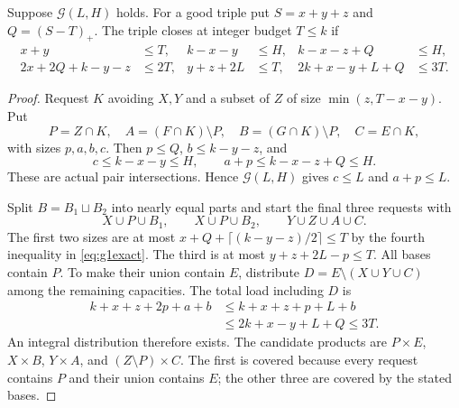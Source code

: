 \begin{lemma}\label{lem:gapsurvive}
Suppose $\mathcal G(L,H)$ holds. For a good triple put $S=x+y+z$ and
$Q=(S-T)_+$. The triple closes at integer budget $T\le k$ if
\begin{align}
 x+y&\le T,& k-x-y&\le H,& k-x-z+Q&\le H,\label{eq:g1exact}\\
 2x+2Q+k-y-z&\le2T,& y+z+2L&\le T,&
 2k+x-y+L+Q&\le3T.\nonumber
\end{align}
\end{lemma}
\begin{proof}
Request $K$ avoiding $X,Y$ and a subset of $Z$ of size
$\min(z,T-x-y)$. Put
\[
 P=Z\cap K,\quad A=(F\cap K)\setminus P,\quad
 B=(G\cap K)\setminus P,\quad C=E\cap K,
\]
with sizes $p,a,b,c$. Then $p\le Q$, $b\le k-y-z$, and
\[
 c\le k-x-y\le H,\qquad a+p\le k-x-z+Q\le H.
\]
These are actual pair intersections. Hence $\mathcal G(L,H)$ gives
$c\le L$ and $a+p\le L$.

Split $B=B_1\sqcup B_2$ into nearly equal parts and start the final
three requests with
\[
 X\cup P\cup B_1,\qquad X\cup P\cup B_2,\qquad Y\cup Z\cup A\cup C.
\]
The first two sizes are at most
$x+Q+\lceil(k-y-z)/2\rceil\le T$ by the fourth inequality in
\eqref{eq:g1exact}. The third is at most $y+z+2L-p\le T$.
All bases contain $P$. To make their union contain $E$, distribute
$D=E\setminus(X\cup Y\cup C)$ among the remaining capacities.
The total load including $D$ is
\begin{align*}
 k+x+z+2p+a+b
 &\le k+x+z+p+L+b\\
 &\le2k+x-y+L+Q\le3T.
\end{align*}
An integral distribution therefore exists. The candidate products are
$P\times E$, $X\times B$, $Y\times A$, and $(Z\setminus P)\times C$.
The first is covered because every request contains $P$ and their union
contains $E$; the other three are covered by the stated bases.
\end{proof}

